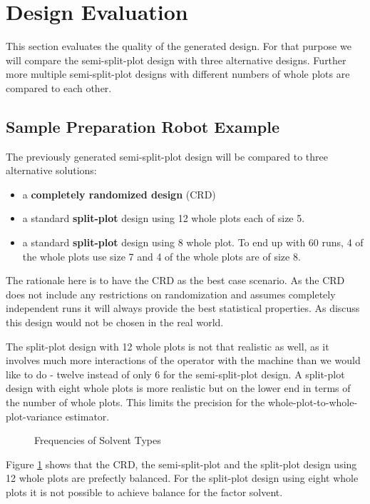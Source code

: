 \section{Design Evaluation} \label{evaluation}

This section evaluates the quality of the generated design. For that purpose we will compare the semi-split-plot design with three alternative designs. Further more multiple semi-split-plot designs with different numbers of whole plots are compared to each other.

\subsection{Sample Preparation Robot Example}

The previously generated semi-split-plot design will be compared to three alternative solutions:

\begin{itemize}
\item a \textbf{completely randomized design} (CRD)
\item a standard \textbf{split-plot} design using 12 whole plots each of size 5.
\item a standard \textbf{split-plot} design using 8 whole plot. To end up with 60 runs, 4 of the whole plots use size 7 and 4 of the whole plots are of size 8.
\end{itemize}

The rationale here is to have the CRD as the best case scenario. As the CRD does not include any restrictions on randomization and assumes completely independent runs it will always provide the best statistical properties. As discuss this design would not be chosen in the real world.

The split-plot design with 12 whole plots is not that realistic as well, as it involves much more interactions of the operator with the machine than we would like to do - twelve instead of only 6 for the semi-split-plot design. A split-plot design with eight whole plots is more realistic but on the lower end in terms of the number of whole plots. This limits the precision for the whole-plot-to-whole-plot-variance estimator.

\begin{figure}[!h]
	\caption{Frequencies of Solvent Types}
	\label{barchart1}
\end{figure}

Figure \ref{barchart1} shows that the CRD, the semi-split-plot and the split-plot design using 12 whole plots are prefectly balanced. For the split-plot design using eight whole plots it is not possible to achieve balance for the factor solvent.


